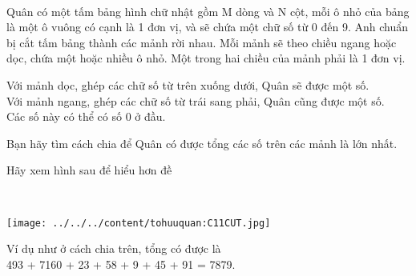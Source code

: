  

Quân có một tấm bảng hình chữ nhật gồm M dòng và N cột, mỗi ô nhỏ của bảng là một ô vuông có cạnh là 1 đơn vị, và sẽ chứa một chữ số từ 0 đến 9. Anh chuẩn bị cắt tấm bảng thành các mảnh rời nhau. Mỗi mảnh sẽ theo chiều ngang hoặc dọc, chứa một hoặc nhiều ô nhỏ. Một trong hai chiều của mảnh phải là 1 đơn vị.

Với mảnh dọc, ghép các chữ số từ trên xuống dưới, Quân sẽ được một số.
\\Với mảnh ngang, ghép các chữ số từ trái sang phải, Quân cũng được một số.
\\Các số này có thể có số 0 ở đầu.

Bạn hãy tìm cách chia để Quân có được tổng các số trên các mảnh là lớn nhất.

Hãy xem hình sau để hiểu hơn đề

 


\texttt{[image: ../../../content/tohuuquan:C11CUT.jpg]}

Ví dụ như ở cách chia trên, tổng có được là
\\493 + 7160 + 23 + 58 + 9 + 45 + 91 = 7879.